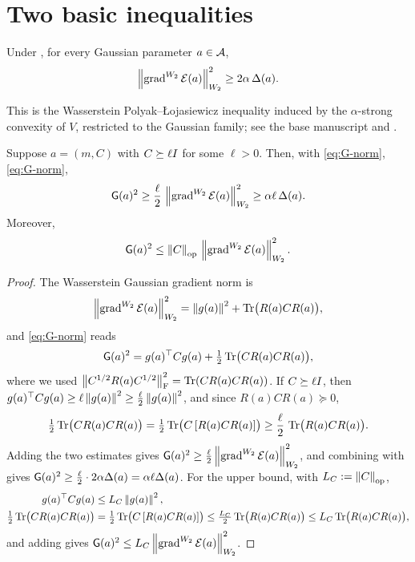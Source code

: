 \section{Two basic inequalities}

\begin{lemma}
\label{lem:W2-PL}
Under , for every Gaussian parameter $a\in\mathcal{A}$,
\[
    \left\lVert \operatorname{grad}^{W_2}\mathcal{E}(a)\right\rVert_{W_2}^2
    \geq
    2\alpha\,\Delta(a).
\]
\end{lemma}

This is the Wasserstein Polyak--{\L}ojasiewicz inequality induced by the
$\alpha$-strong convexity of $V$, restricted to the Gaussian family; see the base
manuscript and \citet{lambert2022variational}.

\begin{lemma}
\label{lem:FR-W2}
Suppose $a=(m,C)$ with $C\succeq\ell I$ for some $\ell>0$. Then, with \eqref{eq:G-norm},
\eqref{eq:G-norm},
\[
    \mathsf{G}(a)^2
    \geq
    \frac{\ell}{2}\,\left\lVert \operatorname{grad}^{W_2}\mathcal{E}(a)\right\rVert_{W_2}^2
    \geq
    \alpha\ell\,\Delta(a).
\]
Moreover,
\[
    \mathsf{G}(a)^2
    \leq
    \left\lVert C\right\rVert_{\mathrm{op}}\,\left\lVert \operatorname{grad}^{W_2}\mathcal{E}(a)\right\rVert_{W_2}^2 .
\]
\end{lemma}

\begin{proof}
The Wasserstein Gaussian gradient norm is
\[
    \left\lVert \operatorname{grad}^{W_2}\mathcal{E}(a)\right\rVert_{W_2}^2
    =
    \left\lVert g(a)\right\rVert^2+\operatorname{Tr}\bigl(R(a)CR(a)\bigr),
\]
and \eqref{eq:G-norm} reads
\[
    \mathsf{G}(a)^2
    =
    g(a)^\top Cg(a)+\tfrac12\operatorname{Tr}\bigl(CR(a)CR(a)\bigr),
\]
where we used $\left\lVert C^{1/2}R(a)C^{1/2}\right\rVert_{\mathrm{F}}^2=\operatorname{Tr}(CR(a)CR(a))$. If $C\succeq\ell I$,
then $g(a)^\top Cg(a)\geq\ell\left\lVert g(a)\right\rVert^2\geq\tfrac{\ell}{2}\left\lVert g(a)\right\rVert^2$, and since
$R(a)CR(a)\succeq0$,
\[
    \tfrac12\operatorname{Tr}\bigl(CR(a)CR(a)\bigr)
    =
    \tfrac12\operatorname{Tr}\bigl(C\,[R(a)CR(a)]\bigr)
    \geq
    \frac{\ell}{2}\,\operatorname{Tr}\bigl(R(a)CR(a)\bigr).
\]
Adding the two estimates gives
$\mathsf{G}(a)^2\geq\tfrac{\ell}{2}\left\lVert \operatorname{grad}^{W_2}\mathcal{E}(a)\right\rVert_{W_2}^2$, and combining with
 gives
$\mathsf{G}(a)^2\geq\tfrac{\ell}{2}\cdot2\alpha\Delta(a)=\alpha\ell\Delta(a)$. For the
upper bound, with $L_C:=\left\lVert C\right\rVert_{\mathrm{op}}$,
\[
    \begin{aligned}
    g(a)^\top Cg(a)&\leq L_C\left\lVert g(a)\right\rVert^2,\\
    \tfrac12\operatorname{Tr}\bigl(CR(a)CR(a)\bigr)
    &=\tfrac12\operatorname{Tr}\bigl(C\,[R(a)CR(a)]\bigr)
    \leq \tfrac{L_C}2\operatorname{Tr}\bigl(R(a)CR(a)\bigr)
    \leq L_C\operatorname{Tr}\bigl(R(a)CR(a)\bigr),
    \end{aligned}
\]
and adding gives $\mathsf{G}(a)^2\leq L_C\left\lVert \operatorname{grad}^{W_2}\mathcal{E}(a)\right\rVert_{W_2}^2$.
\end{proof}

